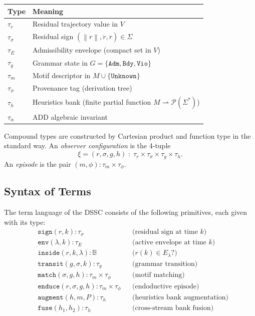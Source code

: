 \documentclass[11pt,a4paper]{article}
\theoremstyle{plain}
\theoremstyle{definition}
\theoremstyle{remark}
\newcommand{\norm}[1]{\left\|#1\right\|}
\begin{document}
\begin{center}
\begin{tabular}{ll}
\toprule
Type & Meaning \\
\midrule
$\tau_r$ & Residual trajectory value in $V$ \\
$\tau_\sigma$ & Residual sign $(\norm{r}, \dot{r}, \ddot{r}) \in \Sigma$ \\
$\tau_E$ & Admissibility envelope (compact set in $V$) \\
$\tau_g$ & Grammar state in $G = \{\mathtt{Adm}, \mathtt{Bdy}, \mathtt{Vio}\}$ \\
$\tau_m$ & Motif descriptor in $M \cup \{\mathtt{Unknown}\}$ \\
$\tau_\phi$ & Provenance tag (derivation tree) \\
$\tau_h$ & Heuristics bank (finite partial function $M \rightharpoonup \mathcal{P}(\Sigma^*)$) \\
$\tau_\alpha$ & ADD algebraic invariant \\
\bottomrule
\end{tabular}
\end{center}

\noindent Compound types are constructed by Cartesian product and function type in the standard
way. An \emph{observer configuration} is the 4-tuple
\begin{equation}
  \xi = (r, \sigma, g, h) \;:\; \tau_r \times \tau_\sigma \times \tau_g \times \tau_h.
\end{equation}
An \emph{episode} is the pair $(m, \phi) : \tau_m \times \tau_\phi$.

\subsection{Syntax of Terms}

The term language of the DSSC consists of the following primitives, each given with its type:
\begin{align*}
  &\mathtt{sign}(r, k) : \tau_\sigma
    && \text{(residual sign at time $k$)} \\
  &\mathtt{env}(\lambda, k) : \tau_E
    && \text{(active envelope at time $k$)} \\
  &\mathtt{inside}(r, k, \lambda) : \mathbb{B}
    && \text{($r(k) \in E_\lambda$?)} \\
  &\mathtt{transit}(g, \sigma, k) : \tau_g
    && \text{(grammar transition)} \\
  &\mathtt{match}(\sigma, g, h) : \tau_m \times \tau_\phi
    && \text{(motif matching)} \\
  &\mathtt{enduce}(r, \sigma, g, h) : \tau_m \times \tau_\phi
    && \text{(endoductive episode)} \\
  &\mathtt{augment}(h, m, P) : \tau_h
    && \text{(heuristics bank augmentation)} \\
  &\mathtt{fuse}(h_1, h_2) : \tau_h
    && \text{(cross-stream bank fusion)}
\end{align*}
\end{document}

